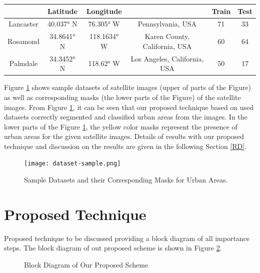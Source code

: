 \documentclass[a4paper,12pt]{spieman}  %
\begin{document}
\begin{spacing}{1}
\begin{table}[]
\begin{tabular}{|c|c|c|c|c|c|}
                          & Latitude       & Longitude       &                                 & Train         & Test         \\ \hline
Lancaster                 & 40.037° N      & 76.305° W       & Pennsylvania, USA               & 71            & 33           \\ \hline
Rosamond                  & 34.8641° N     & 118.1634°  W    & Karen County, California, USA   & 60            & 64           \\ \hline
Palmdale                  & 34.3452° N     & 118.62°  W      & Los Angeles, California, USA    & 50            & 17           \\ \hline
\end{tabular}
\label{dataset-table}
\end{table}
\par Figure \ref{fig:dataset-sample} shows sample datasets of satellite images (upper of parts of the Figure) as well as corresponding masks (the lower parts of the Figure) of the satellite images. From Figure \ref{fig:dataset-sample}, it can be seen that our proposed technique based on used datasets correctly segmented and classified urban areas from the images. In the lower parts of the Figure \ref{fig:dataset-sample}, the yellow color masks represent the presence of urban areas for the given satellite images. Details of results with our proposed technique and discussion on the results are given in the following Section \ref{RD}.
\begin{figure}[h!]
\centering
\texttt{[image: dataset-sample.png]}
\caption{\label{fig:dataset-sample}Sample Datasets and their Corresponding Masks for Urban Areas.}
\end{figure}
\section{Proposed Technique}
Proposed technique to be discussed providing a block diagram of all importance steps. The block diagram of out proposed scheme is shown in Figure \ref{BlockD}.
\begin{figure}[h!]
\centering
\caption{\label{BlockD}Block Diagram of Our Proposed Scheme}
\end{figure}



\end{spacing}
\end{document}
